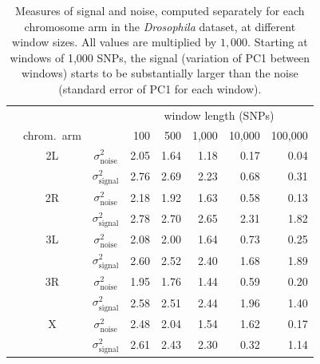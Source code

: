 \documentclass[11pt, oneside]{article}   	%
\begin{document}

\begin{table}[ht]
\centering
    \begin{tabular}{cccrrrrr}
  \hline
        & & & \multicolumn{5}{c}{window length (SNPs)} \\
 & chrom.\ arm  & & 100 & 500 & 1,000 & 10,000 & 100,000 \\ 
  \hline
    & 2L & $\sigma^2_\text{noise}$  & 2.05  &  1.64  &  1.18  &  0.17  &  0.04 \\
    & 	 & $\sigma^2_\text{signal}$ & 2.76  &  2.69  &  2.23  &  0.68  &  0.31 \\
    & 2R & $\sigma^2_\text{noise}$  & 2.18  &  1.92  &  1.63  &  0.58  &  0.13 \\
    & 	 & $\sigma^2_\text{signal}$ & 2.78  &  2.70  &  2.65  &  2.31  &  1.82 \\
    & 3L & $\sigma^2_\text{noise}$  & 2.08  &  2.00  &  1.64  &  0.73  &  0.25 \\
    & 	 & $\sigma^2_\text{signal}$ & 2.60  &  2.52  &  2.40  &  1.68  &  1.89 \\
    & 3R & $\sigma^2_\text{noise}$  & 1.95  &  1.76  &  1.44  &  0.59  &  0.20 \\
    & 	 & $\sigma^2_\text{signal}$ & 2.58  &  2.51  &  2.44  &  1.96  &  1.40 \\
    & X  & $\sigma^2_\text{noise}$  & 2.48  &  2.04  &  1.54  &  1.62  &  0.17 \\
    & 	 & $\sigma^2_\text{signal}$ & 2.61  &  2.43  &  2.30  &  0.32  &  1.14 \\
   \hline
\end{tabular}
\caption{
    Measures of signal and noise,
    computed separately for each chromosome arm in the \textit{Drosophila} dataset,
    at different window sizes.
    All values are multiplied by $1,000$.
    Starting at windows of 1,000 SNPs, the signal (variation of PC1 between windows)
    starts to be substantially larger than the noise (standard error of PC1 for each window).
} \label{tab:window_sizes}
\end{table}
\end{document}
